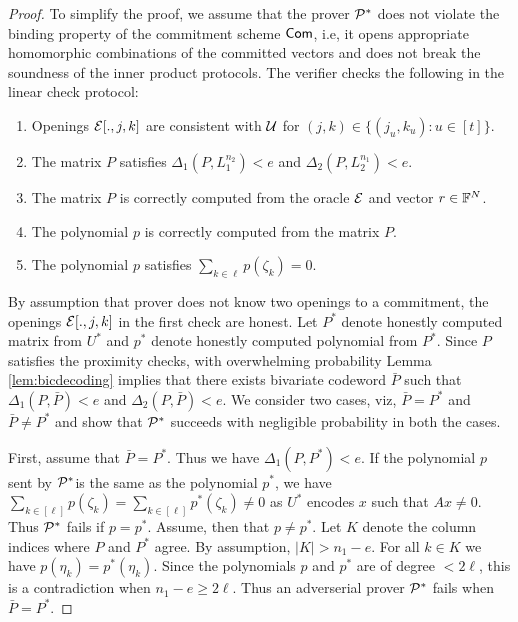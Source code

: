 \begin{proof}
To simplify the proof, we assume that the prover $\mathcal{P}^\ast$ does not violate the
binding property of the commitment scheme $\mathsf{Com}$, i.e, it opens appropriate
homomorphic combinations of the committed vectors and does not break the
soundness of the inner product protocols. The verifier checks the
following in the linear check protocol:
\begin{enumerate}
\item Openings $\mathcal{E}[.,j,k]$ are consistent with $\mathcal{U}$ for
$(j,k)\in \{(j_u,k_u):u\in [t]\}$.
\item The matrix $P$ satisfies $\Delta_1(P,L_1^{n_2})<e$ and
$\Delta_2(P,L_2^{n_1})<e$.
\item The matrix $P$ is correctly computed from the oracle $\mathcal{E}$ and
vector $r\in \mathbb{F}^N$.
\item The polynomial $p$ is correctly computed from the matrix $P$.
\item The polynomial $p$ satisfies $\sum_{k\in \ell}p(\zeta_k)=0$.
\end{enumerate}
By assumption that prover does not know two openings to a commitment, the
openings $\mathcal{E}[.,j,k]$ in the first check are honest. Let $P^\ast$ denote
honestly computed matrix from $U^\ast$ and $p^\ast$ denote honestly computed
polynomial from $P^\ast$. Since $P$ satisfies the proximity checks, with
overwhelming probability Lemma \ref{lem:bicdecoding} implies that there exists bivariate codeword $\bar{P}$ such that
$\Delta_1(P,\bar{P})<e$ and $\Delta_2(P,\bar{P})<e$. We consider two cases,
viz, $\bar{P}=P^\ast$ and $\bar{P}\neq P^\ast$ and show that $\mathcal{P}^\ast$
succeeds with negligible probability in both the cases. 

First, assume that $\bar{P}=P^\ast$. Thus we have $\Delta_1(P,P^\ast)<e$. If
the polynomial $p$ sent by $\mathcal{P}^\ast$is the same as the polynomial $p^\ast$, we have $\sum_{k\in
[\ell]} p(\zeta_k) = \sum_{k\in [\ell]} p^\ast(\zeta_k)\neq 0$ as $U^\ast$
encodes $x$ such that $Ax\neq 0$. Thus $\mathcal{P}^\ast$ fails if $p=p^\ast$. Assume,
then that $p\neq p^\ast$. Let $K$ denote the column indices where $P$ and
$P^\ast$ agree. By assumption, $|K|>n_1-e$. For all $k\in K$ we have
$p(\eta_k)=p^\ast(\eta_k)$. Since the polynomials $p$ and $p^\ast$ are of
degree $<2\ell$, this is a contradiction when $n_1-e\geq 2\ell$. Thus an
adverserial prover $\mathcal{P}^\ast$ fails when $\bar{P}=P^\ast$.


\end{proof}
